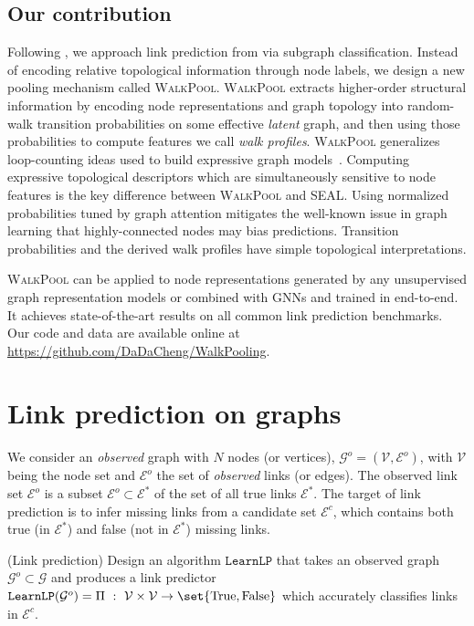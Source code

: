 \documentclass[11pt]{article}
\newcommand{\walkpool}{\textsc{WalkPool}\xspace}
\newcommand{\UPDATE}[1]{\textcolor{WowColor}{{#1}}}
\renewcommand{\UPDATE}[1]{#1}
\begin{document}
\subsection{Our contribution}
\vspace{-2mm}
Following \citet{zhang2018link}, we approach link prediction from via subgraph classification. Instead of encoding relative topological information through node labels, we design a new pooling mechanism called \walkpool. \walkpool extracts higher-order structural information by encoding node representations and graph topology into random-walk transition probabilities on some effective \emph{latent} graph, and then using those probabilities to compute features we call \emph{walk profiles}. \walkpool generalizes loop-counting ideas used to build expressive graph models~\citep{pan2016predicting}. \UPDATE{Computing expressive topological descriptors which are simultaneously sensitive to node features is the key difference between \walkpool and SEAL.} Using normalized probabilities tuned by graph attention mitigates the well-known issue in graph learning that highly-connected nodes may bias predictions.  Transition probabilities and the derived walk profiles have simple topological interpretations. 

\walkpool can be applied to node representations generated by any unsupervised graph representation models or combined with GNNs and trained in end-to-end. It achieves state-of-the-art results on all common link prediction benchmarks. Our code and data are available online at \url{https://github.com/DaDaCheng/WalkPooling}.

\vspace{-2mm}
\section{Link prediction on graphs}
\vspace{-2mm}
We consider an \emph{observed} graph with $N$ nodes (or vertices), $\mathcal{G}^o = (\mathcal{V},\mathcal{E}^o)$, with $\mathcal{V}$ being the node set and $\mathcal{E}^o$ the set of \emph{observed} links (or edges). The observed link set $\mathcal{E}^o$ is a subset $\mathcal{E}^o\subset \mathcal{E}^*$ of the set of all true links $\mathcal{E}^*$. The target of link prediction is to infer missing links from a candidate set $\mathcal{E}^c$, which contains both true (in $\mathcal{E}^*$) and false (not in $\mathcal{E}^*$) missing links.

\begin{problem}(Link prediction)
\label{prob:lp}
Design an algorithm $\mathtt{LearnLP}$ that takes an observed graph $\mathcal{G}^o \subset \mathcal{G}$ and produces a link predictor $\mathtt{LearnLP}(\mathcal{G}^o) = \Pi \ : \ \mathcal{V} \times \mathcal{V} \to \set{\mathrm{True}, \mathrm{False}}$ which accurately classifies links in $\mathcal{E}^c$.
\end{problem}
\end{document}
